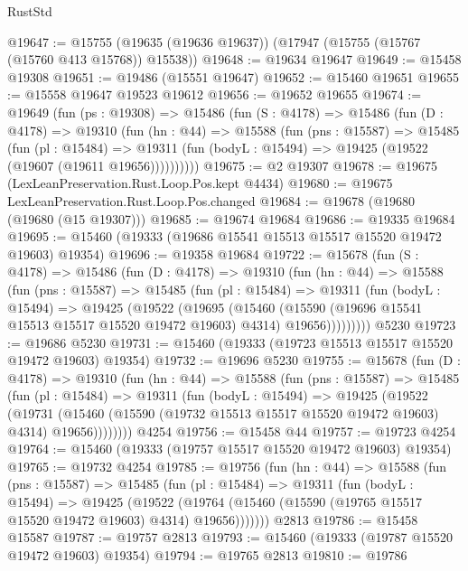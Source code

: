 \begin{lexlean}{RustStd}
\begin{coremodule}
@19647 := @15755 (@19635 (@19636 @19637)) (@17947 (@15755 (@15767 (@15760 @413 @15768)) @15538))
@19648 := @19634 @19647
@19649 := @15458 @19308
@19651 := @19486 (@15551 @19647)
@19652 := @15460 @19651
@19655 := @15558 @19647 @19523 @19612
@19656 := @19652 @19655
@19674 := @19649
    (fun (ps : @19308) =>
    @15486
      (fun (S : @4178) =>
      @15486
        (fun (D : @4178) =>
        @19310
          (fun (hn : @44) =>
          @15588
            (fun (pns : @15587) =>
            @15485
              (fun (pl : @15484) =>
              @19311 (fun (bodyL : @15494) => @19425 (@19522 (@19607 (@19611 @19656))))))))))
@19675 := @2 @19307
@19678 := @19675 (LexLeanPreservation.Rust.Loop.Pos.kept @4434)
@19680 := @19675 LexLeanPreservation.Rust.Loop.Pos.changed
@19684 := @19678 (@19680 (@19680 (@15 @19307)))
@19685 := @19674 @19684
@19686 := @19335 @19684
@19695 := @15460 (@19333 (@19686 @15541 @15513 @15517 @15520 @19472 @19603) @19354)
@19696 := @19358 @19684
@19722 := @15678
    (fun (S : @4178) =>
    @15486
      (fun (D : @4178) =>
      @19310
        (fun (hn : @44) =>
        @15588
          (fun (pns : @15587) =>
          @15485
            (fun (pl : @15484) =>
            @19311
              (fun (bodyL : @15494) =>
              @19425
                (@19522
                  (@19695
                    (@15460
                      (@15590 (@19696 @15541 @15513 @15517 @15520 @19472 @19603) @4314)
                      @19656)))))))))
    @5230
@19723 := @19686 @5230
@19731 := @15460 (@19333 (@19723 @15513 @15517 @15520 @19472 @19603) @19354)
@19732 := @19696 @5230
@19755 := @15678
    (fun (D : @4178) =>
    @19310
      (fun (hn : @44) =>
      @15588
        (fun (pns : @15587) =>
        @15485
          (fun (pl : @15484) =>
          @19311
            (fun (bodyL : @15494) =>
            @19425
              (@19522
                (@19731
                  (@15460 (@15590 (@19732 @15513 @15517 @15520 @19472 @19603) @4314) @19656))))))))
    @4254
@19756 := @15458 @44
@19757 := @19723 @4254
@19764 := @15460 (@19333 (@19757 @15517 @15520 @19472 @19603) @19354)
@19765 := @19732 @4254
@19785 := @19756
    (fun (hn : @44) =>
    @15588
      (fun (pns : @15587) =>
      @15485
        (fun (pl : @15484) =>
        @19311
          (fun (bodyL : @15494) =>
          @19425
            (@19522
              (@19764 (@15460 (@15590 (@19765 @15517 @15520 @19472 @19603) @4314) @19656)))))))
    @2813
@19786 := @15458 @15587
@19787 := @19757 @2813
@19793 := @15460 (@19333 (@19787 @15520 @19472 @19603) @19354)
@19794 := @19765 @2813
@19810 := @19786

\end{coremodule}
\end{lexlean}

